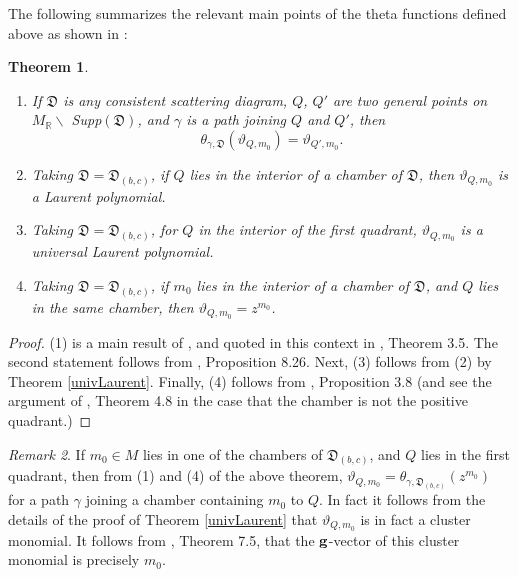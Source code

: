 \documentclass[12pt]{amsart}
\newtheorem{theorem}{Theorem}[section]
\theoremstyle{remark}
\newtheorem{remark}[theorem]{Remark}
\newcommand{\RR}{\mathbb{R}}
\newcommand{\DD}{\mathfrak{D}}
\begin{document}
The following summarizes the relevant main points of the theta functions defined
above as shown in \cite{GHKK}:

\begin{theorem} 
\begin{enumerate}
\item
If $\DD$ is any consistent scattering diagram,
$Q$, $Q'$ are two general points on $M_{\RR} \backslash$ Supp$(\DD)$, and 
$\gamma$ is a path joining $Q$ and $Q'$, then 
\[\theta_{\gamma, \DD }(\vartheta_{Q,m_0}) = \vartheta_{Q', m_0}. \]
\item Taking $\DD=\DD_{(b,c)}$, 
if $Q$ lies in the interior of a chamber of $\DD$, then 
$\vartheta_{Q,m_0}$ is a Laurent polynomial.
\item Taking $\DD=\DD_{(b,c)}$, for $Q$ in the interior of the first
quadrant, $\vartheta_{Q,m_0}$ is
a universal Laurent polynomial.
\item Taking $\DD=\DD_{(b,c)}$, if $m_0$ lies in the interior of a chamber of 
$\DD$, and $Q$ lies in the same chamber, then $\vartheta_{Q,m_0}=z^{m_0}$.
\end{enumerate}
\end{theorem}

\begin{proof}
(1) is a main result of \cite{CPS}, and quoted in this context in
\cite{GHKK}, Theorem 3.5. The second statement follows from
\cite{GHKK}, Proposition 8.26. Next, (3) follows from (2) by Theorem
\ref{univLaurent}. Finally, (4) follows from \cite{GHKK}, Proposition 3.8
(and see the argument of \cite{GHKK}, Theorem 4.8 in the case that
the chamber is not the positive quadrant.)
\end{proof}

\begin{remark}
If $m_0\in M$ lies in one of the chambers of $\DD_{(b,c)}$, and $Q$ lies
in the first quadrant, then from (1) and (4) of the above theorem, 
$\vartheta_{Q,m_0}=\theta_{\gamma,\DD_{(b,c)}}(z^{m_0})$ for a path 
$\gamma$ joining a chamber containing $m_0$ to $Q$. In fact it follows
from the details of the proof of Theorem \ref{univLaurent} 
that $\vartheta_{Q,m_0}$
is in fact a cluster monomial. It follows from \cite{GHKK}, Theorem 7.5,
that the ${\bf g}$-vector of this cluster monomial is precisely $m_0$.
\end{remark}
\end{document}
